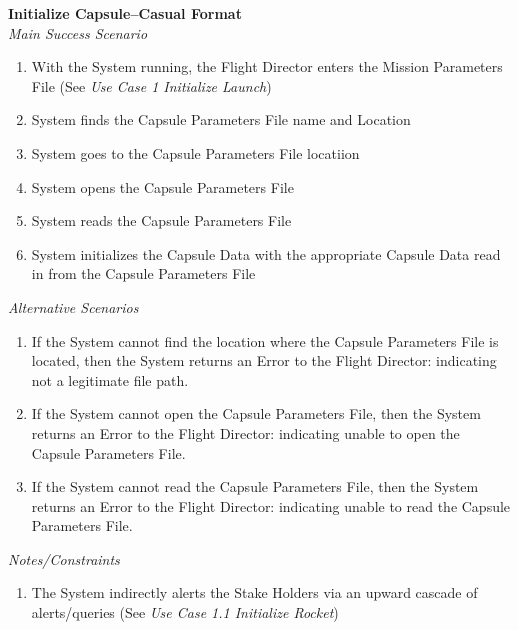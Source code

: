 \documentclass[letterpaper]{article}
\begin{document}
\noindent
\textbf{Initialize Capsule--Casual Format}\\
\textit{Main Success Scenario}
\begin{enumerate}
   \item With the System running, the Flight Director enters the
      Mission Parameters File (See 
      \textit{Use Case 1 Initialize Launch})
   \item System finds the Capsule Parameters File name and Location
   \item System goes to the Capsule Parameters File locatiion
   \item System opens the Capsule Parameters File
   \item System reads the Capsule Parameters File
   \item System initializes the Capsule Data with the appropriate
      Capsule Data read in from the Capsule Parameters File
\end{enumerate}
\textit{Alternative Scenarios}
\begin{enumerate}
   \item[2a,3a]If the System cannot find the location where the 
      Capsule Parameters File is located, then the System returns an
      Error to the Flight Director:  indicating not a legitimate file
      path.
   \item[4a]If the System cannot open the Capsule Parameters File, 
      then the System returns an Error to the Flight Director:
      indicating unable to open the Capsule Parameters File.
   \item[5a]If the System cannot read the Capsule Parameters File, 
      then the System returns an Error to the Flight Director:
      indicating unable to read the Capsule Parameters File.
\end{enumerate}
\textit{Notes/Constraints}
\begin{enumerate}
   \item[6a]The System indirectly alerts the Stake Holders via an
      upward cascade of alerts/queries (See 
      \textit{Use Case 1.1 Initialize Rocket})
\end{enumerate}
\end{document}
